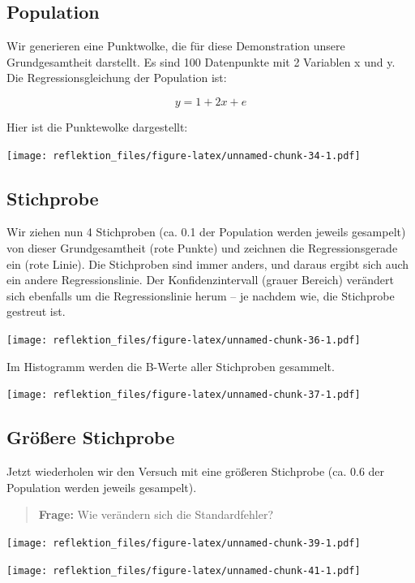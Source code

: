 \documentclass[
]{book}
\begin{document}
\hypertarget{population}{%
\subsection{Population}\label{population}}

Wir generieren eine Punktwolke, die für diese Demonstration unsere Grundgesamtheit darstellt. Es sind 100 Datenpunkte mit 2 Variablen x und y. Die Regressionsgleichung der Population ist:

\[ y = 1 + 2x + e \]

Hier ist die Punktewolke dargestellt:

\texttt{[image: reflektion\_files/figure-latex/unnamed-chunk-34-1.pdf]}

\hypertarget{stichprobe}{%
\subsection{Stichprobe}\label{stichprobe}}

Wir ziehen nun 4 Stichproben (ca. 0.1 der Population werden jeweils gesampelt) von dieser Grundgesamtheit (rote Punkte) und zeichnen die Regressionsgerade ein (rote Linie). Die Stichproben sind immer anders, und daraus ergibt sich auch ein andere Regressionslinie. Der Konfidenzintervall (grauer Bereich) verändert sich ebenfalls um die Regressionslinie herum -- je nachdem wie, die Stichprobe gestreut ist.

\texttt{[image: reflektion\_files/figure-latex/unnamed-chunk-36-1.pdf]}

Im Histogramm werden die B-Werte aller Stichproben gesammelt.

\texttt{[image: reflektion\_files/figure-latex/unnamed-chunk-37-1.pdf]}

\hypertarget{gruxf6uxdfere-stichprobe}{%
\subsection{Größere Stichprobe}\label{gruxf6uxdfere-stichprobe}}

Jetzt wiederholen wir den Versuch mit eine größeren Stichprobe (ca. 0.6 der Population werden jeweils gesampelt).

\begin{quote}
\textbf{Frage:} Wie verändern sich die Standardfehler?
\end{quote}

\texttt{[image: reflektion\_files/figure-latex/unnamed-chunk-39-1.pdf]}

\texttt{[image: reflektion\_files/figure-latex/unnamed-chunk-41-1.pdf]}
\end{document}
